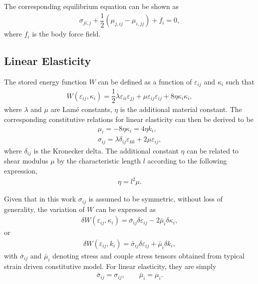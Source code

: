 \documentclass[3p,sort&compress,11pt,fleqn]{elsarticle}
\begin{document}
The corresponding equilibrium equation can be shown as
\begin{gather}\label{eq:equilibrium}
\sigma_{ji,j}+\dfrac{1}{2}\left(\mu_{j,ij}-\mu_{i,jj}\right)+f_i=0,
\end{gather}
where $f_i$ is the body force field.
\subsection{Linear Elasticity}
The stored energy function $W$ can be defined as a function of $\varepsilon_{ij}$ and $\kappa_i$ such that
\begin{gather}
W\left(\varepsilon_{ij},\kappa_i\right)=\dfrac{1}{2}\lambda\varepsilon_{ii}\varepsilon_{jj}+\mu\varepsilon_{ij}\varepsilon_{ij}+8\eta\kappa_i\kappa_i,
\end{gather}
where $\lambda$ and $\mu$ are Lam\'{e} constants, $\eta$ is the additional material constant. The corresponding constitutive relations for linear elasticity can then be derived to be
\begin{gather}\label{eq:constitutive_couple}
\mu_i=-8\eta\kappa_i=4\eta{}k_i,\\
\sigma_{ij}=\lambda\delta_{ij}\varepsilon_{kk}+2\mu\varepsilon_{ij},
\end{gather}
where $\delta_{ij}$ is the Kronecker delta. The additional constant $\eta$ can be related to shear modulus $\mu$ by the characteristic length $l$ according to the following expression,
\begin{gather}
\eta=l^2\mu.
\end{gather}

Given that in this work $\sigma_{ij}$ is assumed to be symmetric, without loss of generality, the variation of $W$ can be expressed as
\begin{gather}\label{eq:potential_energy}
\delta{}W\left(\varepsilon_{ij},\kappa_i\right)=\bar{\sigma}_{ij}\delta\varepsilon_{ij}-2\bar{\mu}_{i}\delta\kappa_i,
\end{gather}
or
\begin{gather}
\delta{}W\left(\varepsilon_{ij},k_i\right)=\bar{\sigma}_{ij}\delta\varepsilon_{ij}+\bar{\mu}_{i}\delta{}k_i,
\end{gather}
with $\bar{\sigma}_{ij}$ and $\bar{\mu}_{i}$ denoting stress and couple stress tensors obtained from typical strain driven constitutive model. For linear elasticity, they are simply
\begin{gather*}
\bar{\sigma}_{ij}=\sigma_{ij},\qquad\bar{\mu}_{i}=\mu_{i}.
\end{gather*}
\end{document}

